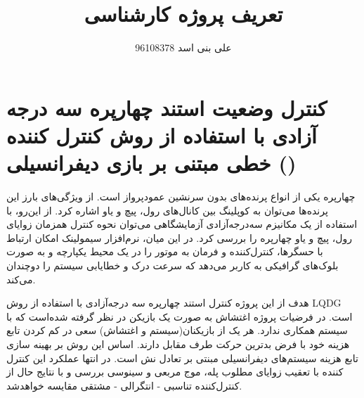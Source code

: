\documentclass[12 pt]{article}
\title{تعریف پروژه کارشناسی}
\author{علی بنی اسد 96108378}
\begin{document}
	\maketitle
	\section*{کنترل وضعیت استند چهارپره
		 سه درجه آزادی 
		با استفاده از روش کنترل کننده خطی مبتنی بر بازی دیفرانسیلی
()	}





چهارپره یکی از انواع پرنده‌های بدون سرنشین عمودپرواز است. از ویژگی‌های بارز این پرنده‌ها می‌توان به کوپلینگ بین کانال‌های رول، پیچ و یاو اشاره کرد. از این‌رو، با استفاده از یک مکانیزم ‌سه‌درجه‌آزادی آزمایشگاهی می‌توان نحوه کنترل همزمان زوایای رول، پیچ و یاو چهارپره را بررسی کرد. در این میان، نرم‌افزار‌ سیمولینک امکان ارتباط با حسگرها، کنترل‌کننده و فرمان به موتور را در یک محیط یکپارچه و به ‌صورت بلوک‌های گرافیکی به کاربر می‌دهد که سرعت درک و خطا‌یابی سیستم را دوچندان می‌کند.



هدف از این پروژه کنترل استند چهارپره سه درجه‌آزادی با استفاده از روش LQDG است. در فرضیات پروژه اغتشاش به صورت یک بازیکن در نظر گرفته شده‌است که با سیستم همکاری ندارد. هر یک از بازیکنان(سیستم و اغتشاش) سعی در کم کردن تابع هزینه خود با فرض بدترین حرکت طرف مقابل دارند. اساس این روش بر بهینه سازی تابع هزینه سیستم‌های دیفرانسیلی مبنتی بر تعادل نش 
است. در انتها عملکرد این کنترل کننده با تعقیب زوایای مطلوب پله، موج مربعی و سینوسی بررسی و با نتایج حال از کنترل‌کننده  تناسبی - انتگرالی -
مشتقی مقایسه خواهد‌شد.
\end{document}
